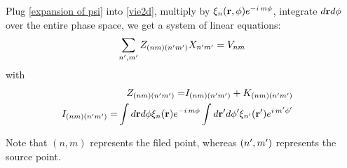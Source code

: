 \documentclass[main]{subfiles}
\begin{document}
Plug \eqref{expansion of psi} into \eqref{vie2d}, multiply by
$\xi_n(\mathbf{r},\phi)e^{-i\,m \phi}$, integrate $d\mathbf{r}d\phi$ over the entire phase
space, we get a system of linear equations:
\begin{equation*}
	\sum\limits_{n^{\prime},m^{\prime}}Z_{(nm)(n^{\prime} m^{\prime})}X_{n^{\prime} m^{\prime}}=V_{nm}
\end{equation*}
with
\begin{align*}
	\begin{split} 
		Z_{(nm)(n^{\prime} m^{\prime})} =& I_{(nm)(n^{\prime} m^{\prime})}+K_{(nm)(n^{\prime} m^{\prime})}
	\end{split}
	\\
	\begin{split} 
		I_{(nm)(n^{\prime} m^{\prime})} =& \int d\mathbf{r}d\phi\xi_n(\mathbf{r})e^{-i\,m\phi}
		\int d\mathbf{r}^{\prime} d\phi^{\prime}\xi_{n^{\prime}}(\mathbf{r}^{\prime})e^{i\,m^{\prime}\phi^{\prime}} 
	\end{split}
\end{align*}

Note that $(n,m)$ represents the filed point, whereas $(n^{\prime},m^{\prime})$ represents 
the source point.
\end{document}
